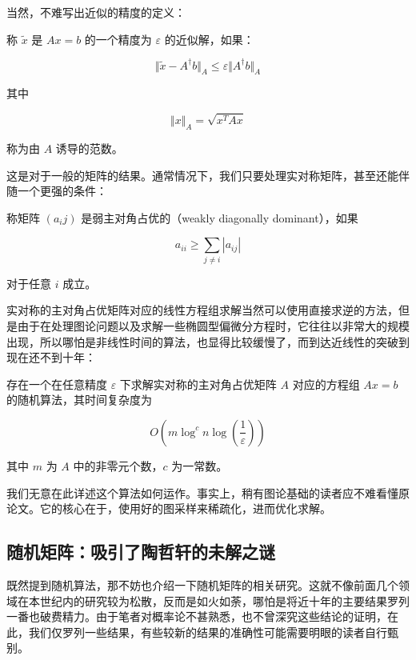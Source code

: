 当然，不难写出近似的精度的定义：

\begin{definition}
    称 $\tilde x$ 是 $Ax = b$ 的一个精度为 $\varepsilon$ 的近似解，如果：

    \[
    \Vert \tilde x - A^\dagger b \Vert_A \leqslant \varepsilon \Vert A^\dagger b \Vert_A
    \]

    其中

    \[
    \Vert x \Vert_A = \sqrt{x^TAx}
    \]

    称为由 $A$ 诱导的范数。
\end{definition}

这是对于一般的矩阵的结果。通常情况下，我们只要处理实对称矩阵，甚至还能伴随一个更强的条件：

\begin{definition}
    称矩阵 $(a_ij)$ 是弱主对角占优的（weakly diagonally dominant），如果

    \[
    a_{ii} \geqslant \sum_{j \neq i} |a_{ij}|
    \]

    对于任意 $i$ 成立。
\end{definition}

实对称的主对角占优矩阵对应的线性方程组求解当然可以使用直接求逆的方法，但是由于在处理图论问题以及求解一些椭圆型偏微分方程时，它往往以非常大的规模出现，所以哪怕是非线性时间的算法，也显得比较缓慢了，而到达近线性的突破到现在还不到十年：

\begin{theorem}
    存在一个在任意精度 $\varepsilon$ 下求解实对称的主对角占优矩阵 $A$ 对应的方程组 $Ax = b$ 的随机算法，其时间复杂度为

    \[
    O(m \log^c n \log(\frac{1}{\varepsilon}))
    \]

    其中 $m$ 为 $A$ 中的非零元个数，$c$ 为一常数。
\end{theorem}

我们无意在此详述这个算法如何运作。事实上，稍有图论基础的读者应不难看懂原论文。它的核心在于，使用好的图采样来稀疏化，进而优化求解。

\subsection{随机矩阵：吸引了陶哲轩的未解之谜}

既然提到随机算法，那不妨也介绍一下随机矩阵的相关研究。这就不像前面几个领域在本世纪内的研究较为松散，反而是如火如荼，哪怕是将近十年的主要结果罗列一番也破费精力。由于笔者对概率论不甚熟悉，也不曾深究这些结论的证明，在此，我们仅罗列一些结果，有些较新的结果的准确性可能需要明眼的读者自行甄别。

